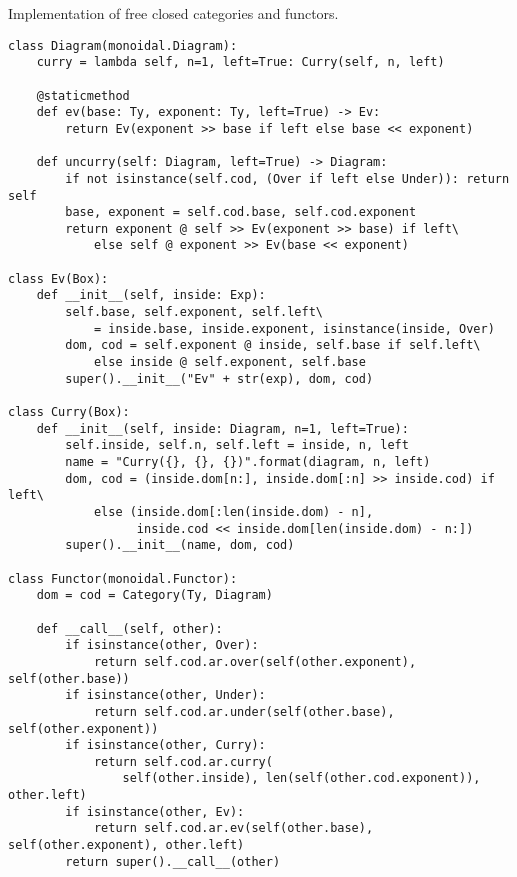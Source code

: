 \begin{python}
{\normalfont Implementation of free closed categories and functors.}

\begin{verbatim}
class Diagram(monoidal.Diagram):
    curry = lambda self, n=1, left=True: Curry(self, n, left)

    @staticmethod
    def ev(base: Ty, exponent: Ty, left=True) -> Ev:
        return Ev(exponent >> base if left else base << exponent)

    def uncurry(self: Diagram, left=True) -> Diagram:
        if not isinstance(self.cod, (Over if left else Under)): return self
        base, exponent = self.cod.base, self.cod.exponent
        return exponent @ self >> Ev(exponent >> base) if left\
            else self @ exponent >> Ev(base << exponent)

class Ev(Box):
    def __init__(self, inside: Exp):
        self.base, self.exponent, self.left\
            = inside.base, inside.exponent, isinstance(inside, Over)
        dom, cod = self.exponent @ inside, self.base if self.left\
            else inside @ self.exponent, self.base
        super().__init__("Ev" + str(exp), dom, cod)

class Curry(Box):
    def __init__(self, inside: Diagram, n=1, left=True):
        self.inside, self.n, self.left = inside, n, left
        name = "Curry({}, {}, {})".format(diagram, n, left)
        dom, cod = (inside.dom[n:], inside.dom[:n] >> inside.cod) if left\
            else (inside.dom[:len(inside.dom) - n],
                  inside.cod << inside.dom[len(inside.dom) - n:])
        super().__init__(name, dom, cod)

class Functor(monoidal.Functor):
    dom = cod = Category(Ty, Diagram)

    def __call__(self, other):
        if isinstance(other, Over):
            return self.cod.ar.over(self(other.exponent), self(other.base))
        if isinstance(other, Under):
            return self.cod.ar.under(self(other.base), self(other.exponent))
        if isinstance(other, Curry):
            return self.cod.ar.curry(
                self(other.inside), len(self(other.cod.exponent)), other.left)
        if isinstance(other, Ev):
            return self.cod.ar.ev(self(other.base), self(other.exponent), other.left)
        return super().__call__(other)
\end{verbatim}
\end{python}

